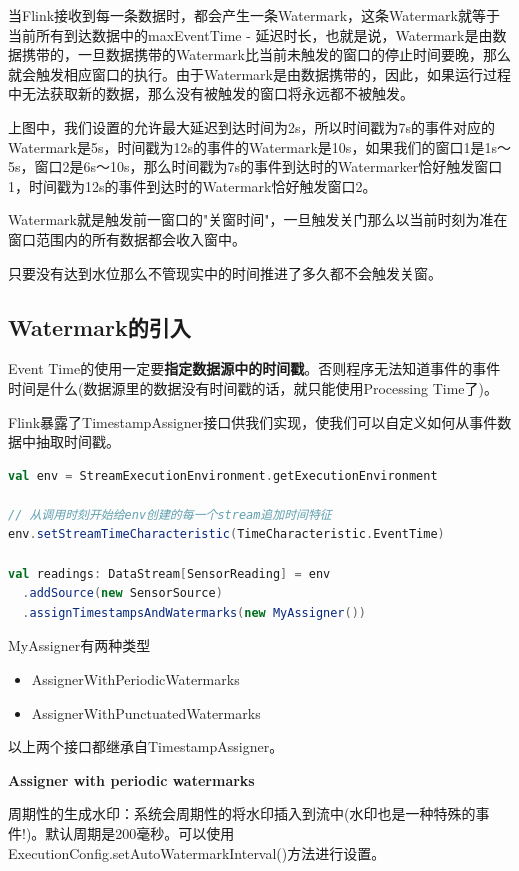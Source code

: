 \documentclass[oneside]{ctexbook}
\begin{document}
当Flink接收到每一条数据时，都会产生一条Watermark，这条Watermark就等于当前所有到达数据中的maxEventTime - 延迟时长，也就是说，Watermark是由数据携带的，一旦数据携带的Watermark比当前未触发的窗口的停止时间要晚，那么就会触发相应窗口的执行。由于Watermark是由数据携带的，因此，如果运行过程中无法获取新的数据，那么没有被触发的窗口将永远都不被触发。

上图中，我们设置的允许最大延迟到达时间为2s，所以时间戳为7s的事件对应的Watermark是5s，时间戳为12s的事件的Watermark是10s，如果我们的窗口1是1s～5s，窗口2是6s～10s，那么时间戳为7s的事件到达时的Watermarker恰好触发窗口1，时间戳为12s的事件到达时的Watermark恰好触发窗口2。
 
Watermark就是触发前一窗口的"关窗时间"，一旦触发关门那么以当前时刻为准在窗口范围内的所有数据都会收入窗中。

只要没有达到水位那么不管现实中的时间推进了多久都不会触发关窗。

\subsection{Watermark的引入}

Event Time的使用一定要\textbf{指定数据源中的时间戳}。否则程序无法知道事件的事件时间是什么(数据源里的数据没有时间戳的话，就只能使用Processing Time了)。

Flink暴露了TimestampAssigner接口供我们实现，使我们可以自定义如何从事件数据中抽取时间戳。

\begin{lstlisting}[language=scala]
val env = StreamExecutionEnvironment.getExecutionEnvironment
 
// 从调用时刻开始给env创建的每一个stream追加时间特征
env.setStreamTimeCharacteristic(TimeCharacteristic.EventTime)

val readings: DataStream[SensorReading] = env
  .addSource(new SensorSource)
  .assignTimestampsAndWatermarks(new MyAssigner())
\end{lstlisting}

MyAssigner有两种类型

\begin{itemize}
\item AssignerWithPeriodicWatermarks
\item AssignerWithPunctuatedWatermarks
\end{itemize}

以上两个接口都继承自TimestampAssigner。

\textbf{Assigner with periodic watermarks}

周期性的生成水印：系统会周期性的将水印插入到流中(水印也是一种特殊的事件!)。默认周期是200毫秒。可以使用ExecutionConfig.setAutoWatermarkInterval()方法进行设置。
\end{document}
